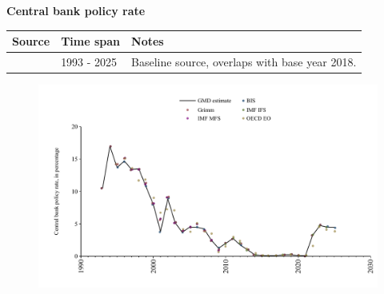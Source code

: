 \documentclass[12pt,a4paper,landscape]{article}
\begin{document}
\begin{adjustbox}{max totalsize={\paperwidth}{\paperheight},center}
\begin{minipage}[t][\textheight][t]{\textwidth}
\vspace*{0.5cm}
{}
\begin{center}
{\Large\bfseries Central bank policy rate}
\end{center}
\vspace{0.5cm}
\begin{table}[H]
\centering
\small
\begin{tabular}{|l|l|l|}
\hline
\textbf{Source} & \textbf{Time span} & \textbf{Notes} \\
\hline
\rowcolor{white}\cite{BIS}& 1993 - 2025 &Baseline source, overlaps with base year 2018. \\
\hline
\end{tabular}
\end{table}
\begin{figure}[H]
\centering
\includegraphics[width=\textwidth,height=0.6\textheight,keepaspectratio]{graphs/ISR_cbrate.pdf}
\end{figure}
\end{minipage}
\end{adjustbox}
\end{document}
